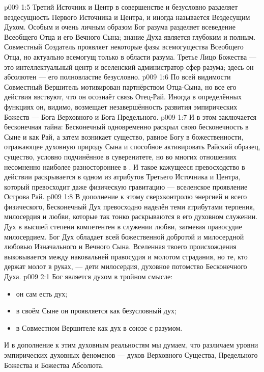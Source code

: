 \vs p009 1:5 \pc Третий Источник и Центр в совершенстве и безусловно разделяет вездесущность Первого Источника и Центра, и иногда называется Вездесущим Духом. Особым и очень личным образом Бог разума разделяет всеведение Всеобщего Отца и его Вечного Сына; знание Духа является глубоким и полным. Совместный Создатель проявляет некоторые фазы всемогущества Всеобщего Отца, но актуально всемогущ только в области разума. Третье Лицо Божества --- это интеллектуальный центр и вселенский администратор сфер разума; здесь он абсолютен --- его полновластие безусловно.
\vs p009 1:6 По всей видимости Совместный Вершитель мотивирован партнёрством Отца\hyp{}Сына, но все его действия явствуют, что он осознаёт связь Отец\hyp{}Рай. Иногда в определённых функциях он, видимо, возмещает незавершённость развития эмпирических Божеств --- Бога Верховного и Бога Предельного.
\vs p009 1:7 \pc И в этом заключается бесконечная тайна: Бесконечный одновременно раскрыл свою бесконечность в Сыне и как Рай, а затем возникает существо, равное Богу в божественности, отражающее духовную природу Сына и способное активировать Райский образец, существо, условно подчинённое в суверенитете, но во многих отношениях несомненно наиболее разностороннее в . И такое кажущееся превосходство в действии раскрывается в одном из атрибутов Третьего Источника и Центра, который превосходит даже физическую гравитацию --- вселенское проявление Острова Рай.
\vs p009 1:8 В дополнение к этому сверхконтролю энергией и всего физического, Бесконечный Дух превосходно наделён теми атрибутами терпения, милосердия и любви, которые так тонко раскрываются в его духовном служении. Дух в высшей степени компетентен в служении любви, затмевая правосудие милосердием. Бог Дух обладает всей божественной добротой и милосердной любовью Изначального и Вечного Сына. Вселенная твоего происхождения выковывается между наковальней правосудия и молотом страдания, но те, кто держат молот в руках, --- дети милосердия, духовное потомство Бесконечного Духа.
\vs p009 2:1 Бог является духом в тройном смысле:\begin{itemize}\item он сам есть дух; \item в своём Сыне он проявляется как безусловный дух; \item в Совместном Вершителе как дух в союзе с разумом.\end{itemize} И в дополнение к этим духовным реальностям мы думаем, что различаем уровни эмпирических духовных феноменов --- духов Верховного Существа, Предельного Божества и Божества Абсолюта.
